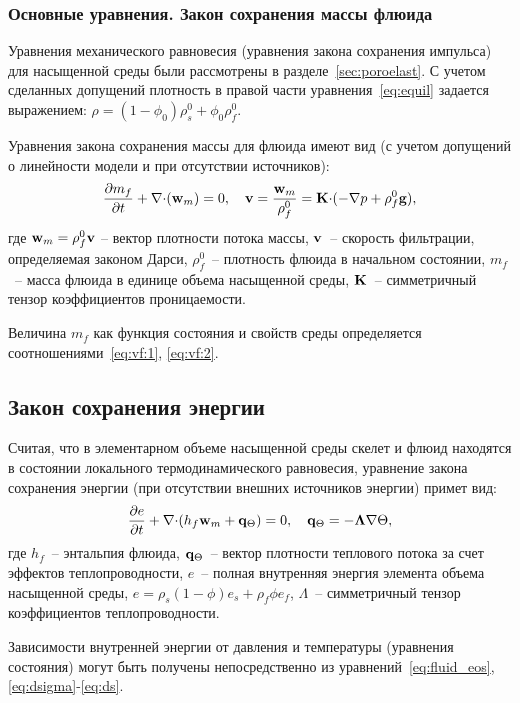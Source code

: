 \subsubsection{Основные уравнения. Закон сохранения массы флюида}

Уравнения механического равновесия (уравнения закона сохранения
импульса) для насыщенной среды были рассмотрены в
разделе~\ref{sec:poroelast}.  С учетом сделанных допущений плотность в
правой части уравнения~\eqref{eq:equil} задается выражением:
%
$\rho = (1-\phi_0) \rho_s^0 + \phi_0 \rho_f^0$.
%

Уравнения закона сохранения массы для флюида имеют вид (с учетом
допущений о линейности модели и при отсутствии источников):
%
\begin{equation*}
\frac{\partial{m_f}}{\partial{t}} + \nabla\mathbf{\cdot} (\mathbf{w}_m) = 0,\quad 
\mathbf{v} = \frac{\mathbf{w}_m}{\rho_f^0} = \mathbf{K}\mathbf{\cdot} (-\nabla p + \rho_f^0 \mathbf{g}),
\end{equation*}
%
где
%
\(
\mathbf{w}_m = \rho_f^0 \mathbf{v}
\)
%
-- вектор плотности потока массы,
$\mathbf{v}$~-- скорость фильтрации, определяемая законом Дарси,
%
%
$\rho_f^0$~-- плотность флюида в начальном состоянии, 
$m_f$~-- масса флюида в единице объема насыщенной среды, 
$\mathbf{K}$~-- симметричный тензор коэффициентов проницаемости.

Величина $m_f$ как функция состояния и свойств среды определяется соотношениями~\eqref{eq:vf:1}, \eqref{eq:vf:2}.

\subsection{Закон сохранения энергии}

Считая, что в элементарном объеме насыщенной среды скелет и флюид 
находятся в состоянии локального термодинамического равновесия,
уравнение закона сохранения энергии (при отсутствии внешних источников энергии) примет вид:
%
\[
\frac{\partial{e}}{\partial{t}} + \nabla\mathbf{\cdot}(h_f \mathbf{w}_m + \mathbf{q}_\Theta) = 0,\quad
\mathbf{q}_\Theta = -\mathbf{\Lambda} \nabla \Theta,
\]
%
где
$h_f$~-- энтальпия флюида,
$\mathbf{q}_\Theta$~-- вектор плотности теплового потока за счет эффектов теплопроводности,
$e$~-- полная внутренняя энергия элемента объема насыщенной среды,
%
\(
e = \rho_s (1-\phi)e_s + \rho_f\phi e_f
\),
$\Lambda$~-- симметричный тензор коэффициентов теплопроводности.

Зависимости внутренней энергии от давления и температуры (уравнения
состояния) могут быть получены непосредственно из
уравнений~\eqref{eq:fluid_eos}, \eqref{eq:dsigma}-\eqref{eq:ds}.

